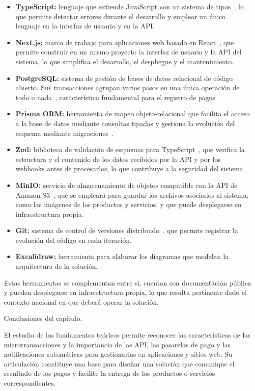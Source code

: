 \documentclass[12pt]{article}
\newcommand\doceUnoCinco{\fontsize{12bp}{20.7bp}\selectfont}      %
\newcommand\vacio{\leavevmode\par}
\newcommand\tituloII[1]{%
  \par\vspace{5.65bp}%
  {\parskip=0pt\doceUnoCinco\bfseries
   \leavevmode\phantomsection\addcontentsline{toc}{subsection}{#1}%
   #1\par}%
  \nopagebreak
  \vspace{\dimexpr5.65bp-\parskip\relax}}
\begin{document}
\begin{itemize}[parsep=5.7bp]
  \item \textbf{TypeScript:} lenguaje que extiende JavaScript con un sistema de tipos~\cite{typescript}, lo que permite detectar errores durante el desarrollo y emplear un único lenguaje en la interfaz de usuario y en la API.
  \item \textbf{Next.js:} marco de trabajo para aplicaciones web basado en React~\cite{nextjs}, que permite construir en un mismo proyecto la interfaz de usuario y la API del sistema, lo que simplifica el desarrollo, el despliegue y el mantenimiento.
  \item \textbf{PostgreSQL:} sistema de gestión de bases de datos relacional de código abierto. Sus transacciones agrupan varios pasos en una única operación de todo o nada~\cite{postgres}, característica fundamental para el registro de pagos.
  \item \textbf{Prisma ORM:} herramienta de mapeo objeto-relacional que facilita el acceso a la base de datos mediante consultas tipadas y gestiona la evolución del esquema mediante migraciones~\cite{prisma}.
  \item \textbf{Zod:} biblioteca de validación de esquemas para TypeScript~\cite{zod}, que verifica la estructura y el contenido de los datos recibidos por la API y por los webhooks antes de procesarlos, lo que contribuye a la seguridad del sistema.
  \item \textbf{MinIO:} servicio de almacenamiento de objetos compatible con la API de Amazon S3~\cite{minio}, que se empleará para guardar los archivos asociados al sistema, como las imágenes de los productos y servicios, y que puede desplegarse en infraestructura propia.
  \item \textbf{Git:} sistema de control de versiones distribuido~\cite{chacon14}, que permite registrar la evolución del código en cada iteración.
  \item \textbf{Excalidraw:} herramienta para elaborar los diagramas que modelan la arquitectura de la solución.
\end{itemize}

\vacio
Estas herramientas se complementan entre sí, cuentan con documentación pública y pueden desplegarse en infraestructura propia, lo que resulta pertinente dado el contexto nacional en que deberá operar la solución.

\vacio
\tituloII{Conclusiones del capítulo.}

El estudio de los fundamentos teóricos permite reconocer las características de las microtransacciones y la importancia de las API, las pasarelas de pago y las notificaciones automáticas para gestionarlas en aplicaciones y sitios web. Su articulación constituye una base para diseñar una solución que comunique el resultado de los pagos y facilite la entrega de los productos o servicios correspondientes.
\end{document}

